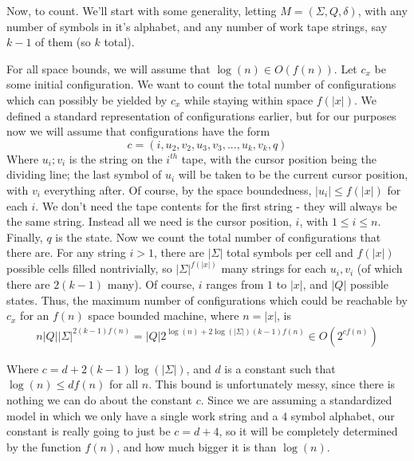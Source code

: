 Now, to count. We'll start with some generality, letting $M = (\Sigma,Q,\delta)$, with any number of symbols in it's alphabet, and any number of work tape strings, say $k-1$ of them (so $k$ total). 
\par For all space bounds, we will assume that $\log(n) \in O(f(n))$. Let $c_x$ be some initial configuration. We want to count the total number of configurations which can possibly be yielded by $c_x$ while staying within space $f(|x|)$. We defined a standard representation of configurations earlier, but for our purposes now we will assume that configurations have the form
\[ c=(i,u_2,v_2,u_3,v_3,...,u_k,v_k,q) \]
Where $u_i;v_i$ is the string on the $i^{th}$ tape, with the cursor position being the dividing line; the last symbol of $u_i$ will be taken to be the current cursor position, with $v_i$ everything after. Of course, by the space boundedness, $|u_i| \leq f(|x|)$ for each $i$. We don't need the tape contents for the first string - they will always be the same string. Instead all we need is the cursor position, $i$, with $1 \leq i \leq n$. Finally, $q$ is the state. Now we count the total number of configurations that there are. For any string $i>1$, there are $|\Sigma|$ total symbols per cell and $f(|x|)$ possible cells filled nontrivially, so $|\Sigma|^{f(|x|)}$ many strings for each $u_i,v_i$ (of which there are $2(k-1)$ many). Of course, $i$ ranges from $1$ to $|x|$, and $|Q|$ possible states.
Thus, the maximum number of configurations which could be reachable by $c_x$ for an $f(n)$ space bounded machine, where $n=|x|$, is
\begin{align}
n|Q||\Sigma|^{2(k-1)f(n)} = |Q|2^{\log(n)+2\log(|\Sigma|)(k-1)f(n)} \in O(2^{cf(n)})
\end{align}
\par Where $c = d + 2(k-1)\log(|\Sigma|)$, and $d$ is a constant such that $\log(n) \leq df(n)$ for all $n$. This bound is unfortunately messy, since there is nothing we can do about the constant $c$. Since we are assuming a standardized model in which we only have a single work string and a $4$ symbol alphabet, our constant is really going to just be $c = d+4$, so it will be completely determined by the function $f(n)$, and how much bigger it is than $\log(n)$. 
